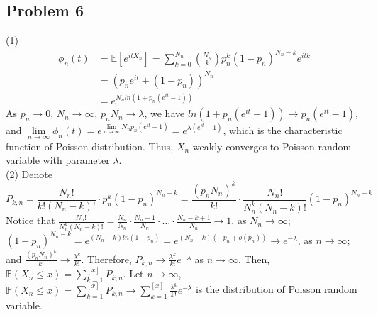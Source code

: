 \documentclass[12pt]{article}
\begin{document}
\subsection*{Problem 6}
(1)\begin{align*}
\phi_{n}(t)&= \mathbb{E}[e^{itX_{n}}]=\sum_{k=0}^{N_{n}}\binom{N_{n}}{k}p_n^{k}(1-p_n)^{N_{n}-k}e^{itk}\\
&=(p_{n}e^{it}+(1-p_n))^{N_{n}}\\
&=e^{N_{n}ln(1+p_{n}(e^{it}-1))}
\end{align*}
As $p_n\rightarrow 0$, $N_{n}\rightarrow\infty$, $p_{n}N_{n}\rightarrow \lambda$, we have $ln(1+p_{n}(e^{it}-1))\rightarrow p_{n}(e^{it}-1)$, and $\lim\limits_{n\rightarrow\infty}\phi_{n}(t)= e^{\lim\limits_{n\rightarrow\infty}N_{n}p_{n}(e^{it}-1)}=e^{\lambda (e^{it}-1)}$, which is the characteristic function of Poisson distribution. Thus, $X_{n}$ weakly converges to Poisson random variable with parameter $\lambda$.\\
(2) Denote $$P_{k,n}=\frac{N_{n}!}{k!(N_{n}-k)!}\cdot p_{n}^{k}(1-p_{n})^{N_{n}-k}=\frac{(p_{n}N_{n})^{k}}{k!}\cdot \frac{N_{n}!}{N_{n}^{k}(N_{n}-k)!}(1-p_{n})^{N_{n}-k}$$
Notice that $\frac{N_{n}!}{N_{n}^{k}(N_{n}-k)!}=\frac{N_{n}}{N_{n}}\cdot\frac{N_{n}-1}{N_{n}}\cdot\dots\cdot\frac{N_{n}-k+1}{N_{n}}\rightarrow 1$, as $N_{n}\rightarrow\infty$;\\ 
$(1-p_{n})^{N_{n}-k}=e^{(N_{n}-k)ln(1-p_{n})}=e^{(N_{n}-k)(-p_{n}+o(p_{n}))}\rightarrow e^{-\lambda}$, as $n\rightarrow\infty$; \\ and $\frac{(p_{n}N_{n})^{k}}{k!}\rightarrow\frac{\lambda^{k}}{k!}$. Therefore, $P_{k,n}\rightarrow\frac{\lambda^{k}}{k!}e^{-\lambda}$ as $n\rightarrow\infty$. Then, $\mathbb{P}(X_{n}\leqslant x)=\sum_{k=1}^{[x]}P_{k,n}$. Let $n\rightarrow\infty$, $\mathbb{P}(X_{n}\leqslant x)=\sum_{k=1}^{[x]}P_{k,n}\rightarrow\sum_{k=1}^{[x]}\frac{\lambda^{k}}{k!}e^{-\lambda}$ is the distribution of Poisson random variable.
\end{document}
